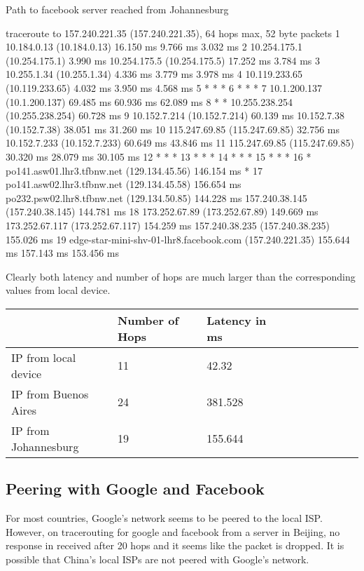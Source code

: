 Path to facebook server reached from Johannesburg
\begin{code}
traceroute to 157.240.221.35 (157.240.221.35), 64 hops max, 52 byte packets
 1  10.184.0.13 (10.184.0.13)  16.150 ms  9.766 ms  3.032 ms
 2  10.254.175.1 (10.254.175.1)  3.990 ms
    10.254.175.5 (10.254.175.5)  17.252 ms  3.784 ms
 3  10.255.1.34 (10.255.1.34)  4.336 ms  3.779 ms  3.978 ms
 4  10.119.233.65 (10.119.233.65)  4.032 ms  3.950 ms  4.568 ms
 5  * * *
 6  * * *
 7  10.1.200.137 (10.1.200.137)  69.485 ms  60.936 ms  62.089 ms
 8  * * 10.255.238.254 (10.255.238.254)  60.728 ms
 9  10.152.7.214 (10.152.7.214)  60.139 ms
    10.152.7.38 (10.152.7.38)  38.051 ms  31.260 ms
10  115.247.69.85 (115.247.69.85)  32.756 ms
    10.152.7.233 (10.152.7.233)  60.649 ms  43.846 ms
11  115.247.69.85 (115.247.69.85)  30.320 ms  28.079 ms  30.105 ms
12  * * *
13  * * *
14  * * *
15  * * *
16  * po141.asw01.lhr3.tfbnw.net (129.134.45.56)  146.154 ms *
17  po141.asw02.lhr3.tfbnw.net (129.134.45.58)  156.654 ms
    po232.psw02.lhr8.tfbnw.net (129.134.50.85)  144.228 ms
    157.240.38.145 (157.240.38.145)  144.781 ms
18  173.252.67.89 (173.252.67.89)  149.669 ms
    173.252.67.117 (173.252.67.117)  154.259 ms
    157.240.38.235 (157.240.38.235)  155.026 ms
19  edge-star-mini-shv-01-lhr8.facebook.com (157.240.221.35)  155.644 ms  157.143 ms  153.456 ms
\end{code}

Clearly both latency and number of hops are much larger than the corresponding values from local device.

\begin{table}[!ht]
    \centering
    \begin{tabular}{|l|l|l|l|l|l|l|l|l|l|}
    \hline
        ~ &Number of Hops & Latency in ms \\ \hline
        IP from local device & 11 & 42.32  \\ \hline
        IP from Buenos Aires & 24 & 381.528 \\ \hline
        IP from Johannesburg & 19 & 155.644 \\ \hline
        
    \end{tabular}
\end{table}
\subsection*{Peering with Google and Facebook}

For most countries, Google's network seems to be peered to the local ISP. However, on tracerouting for google and facebook from a 
server in Beijing, no response in received after 20 hops and it seems like the packet is dropped. It is possible that China's local 
ISPs are not peered with Google's network.

